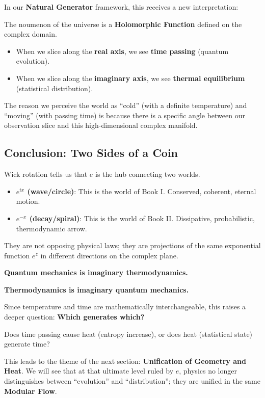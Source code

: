 \documentclass[11pt,a4paper,twoside]{book}
\begin{document}
In our \textbf{Natural Generator} framework, this receives a new interpretation:

The noumenon of the universe is a \textbf{Holomorphic Function} defined on the complex domain.

\begin{itemize}
\item When we slice along the \textbf{real axis}, we see \textbf{time passing} (quantum evolution).

\item When we slice along the \textbf{imaginary axis}, we see \textbf{thermal equilibrium} (statistical distribution).
\end{itemize}

The reason we perceive the world as ``cold'' (with a definite temperature) and ``moving'' (with passing time) is because there is a specific angle between our observation slice and this high-dimensional complex manifold.

\subsection{Conclusion: Two Sides of a Coin}

Wick rotation tells us that $e$ is the hub connecting two worlds.

\begin{itemize}
\item \textbf{$e^{ix}$ (wave/circle)}: This is the world of Book I. Conserved, coherent, eternal motion.

\item \textbf{$e^{-x}$ (decay/spiral)}: This is the world of Book II. Dissipative, probabilistic, thermodynamic arrow.
\end{itemize}

They are not opposing physical laws; they are projections of the same exponential function $e^z$ in different directions on the complex plane.

\textbf{Quantum mechanics is imaginary thermodynamics.}

\textbf{Thermodynamics is imaginary quantum mechanics.}

Since temperature and time are mathematically interchangeable, this raises a deeper question: \textbf{Which generates which?}

Does time passing cause heat (entropy increase), or does heat (statistical state) generate time?

This leads to the theme of the next section: \textbf{Unification of Geometry and Heat}. We will see that at that ultimate level ruled by $e$, physics no longer distinguishes between ``evolution'' and ``distribution''; they are unified in the same \textbf{Modular Flow}.
\end{document}
